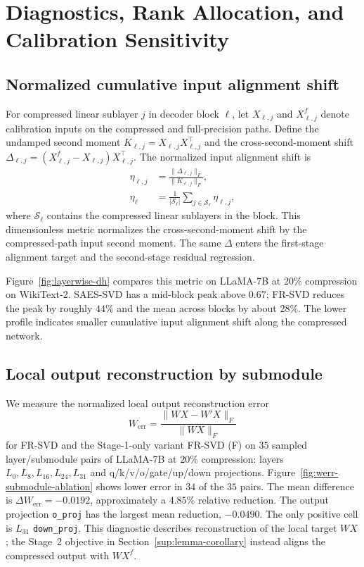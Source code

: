 

\section{Diagnostics, Rank Allocation, and Calibration Sensitivity}\label{app:diagnostics}

\subsection{Normalized cumulative input alignment shift}
For compressed linear sublayer $j$ in decoder block $\ell$, let $X_{\ell,j}$ and $X_{\ell,j}^f$ denote calibration inputs on the compressed and full-precision paths. Define the undamped second moment $K_{\ell,j}=X_{\ell,j}X_{\ell,j}^\top$ and the cross-second-moment shift $\Delta_{\ell,j}=(X_{\ell,j}^f-X_{\ell,j})X_{\ell,j}^\top$. The normalized input alignment shift is
\begin{equation}
\begin{aligned}
\eta_{\ell,j}&=\frac{\|\Delta_{\ell,j}\|_F}{\|K_{\ell,j}\|_F},\\
\eta_\ell&=\frac1{|\mathcal S_\ell|}\sum_{j\in\mathcal S_\ell}\eta_{\ell,j},
\end{aligned}
\label{eq:app-input-shift}
\end{equation}
where $\mathcal S_\ell$ contains the compressed linear sublayers in the block. This dimensionless metric normalizes the cross-second-moment shift by the compressed-path input second moment. The same $\Delta$ enters the first-stage alignment target and the second-stage residual regression.

Figure~\ref{fig:layerwise-dh} compares this metric on LLaMA-7B at $20\%$ compression on WikiText-2. SAES-SVD has a mid-block peak above $0.67$; FR-SVD reduces the peak by roughly $44\%$ and the mean across blocks by about $28\%$. The lower profile indicates smaller cumulative input alignment shift along the compressed network.


\subsection{Local output reconstruction by submodule}
We measure the normalized local output reconstruction error
\begin{equation}
W_{\mathrm{err}}=\frac{\|WX-W'X\|_F}{\|WX\|_F}
\label{eq:app-werr}
\end{equation}
for FR-SVD and the Stage-1-only variant FR-SVD (F) on $35$ sampled layer/submodule pairs of LLaMA-7B at $20\%$ compression: layers $L_0,L_8,L_{16},L_{24},L_{31}$ and q/k/v/o/gate/up/down projections. Figure~\ref{fig:werr-submodule-ablation} shows lower error in $34$ of the $35$ pairs. The mean difference is $\Delta W_{\mathrm{err}}=-0.0192$, approximately a $4.85\%$ relative reduction. The output projection \texttt{o\_proj} has the largest mean reduction, $-0.0490$. The only positive cell is $L_{31}$ \texttt{down\_proj}. This diagnostic describes reconstruction of the local target $WX$; the Stage~2 objective in Section~\ref{sup:lemma-corollary} instead aligns the compressed output with $WX^f$.

